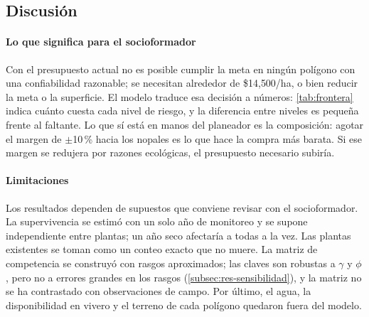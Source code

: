 \subsection{Discusión}
\label{subsec:discusion}

\paragraph{Lo que significa para el socioformador} Con el presupuesto actual no es posible cumplir la meta en ningún polígono con una confiabilidad razonable; se necesitan alrededor de \$14{,}500/ha, o bien reducir la meta o la superficie. El modelo traduce esa decisión a números: \cref{tab:frontera} indica cuánto cuesta cada nivel de riesgo, y la diferencia entre niveles es pequeña frente al faltante. Lo que sí está en manos del planeador es la composición: agotar el margen de $\pm$10\,\% hacia los nopales es lo que hace la compra más barata. Si ese margen se redujera por razones ecológicas, el presupuesto necesario subiría.

\paragraph{Limitaciones} Los resultados dependen de supuestos que conviene revisar con el socioformador. La supervivencia se estimó con un solo año de monitoreo y se supone independiente entre plantas; un año seco afectaría a todas a la vez. Las plantas existentes se toman como un conteo exacto que no muere. La matriz de competencia se construyó con rasgos aproximados; las claves son robustas a $\gamma$ y $\phi$, pero no a errores grandes en los rasgos (\cref{subsec:res-sensibilidad}), y la matriz no se ha contrastado con observaciones de campo. Por último, el agua, la disponibilidad en vivero y el terreno de cada polígono quedaron fuera del modelo.
